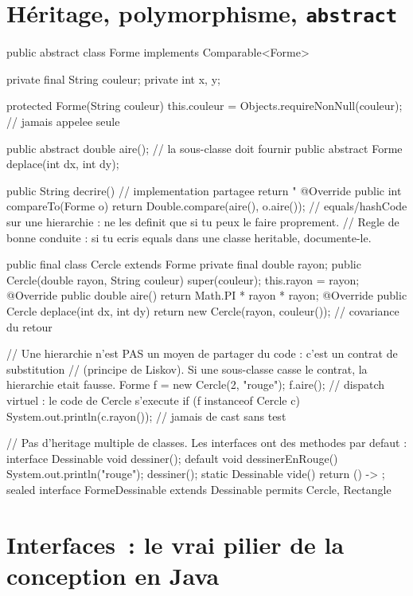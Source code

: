 \section{H\'eritage, polymorphisme, \texttt{abstract}}

\begin{codejava}
public abstract class Forme implements Comparable<Forme> {
    private final String couleur;
    private int x, y;

    protected Forme(String couleur) { this.couleur = Objects.requireNonNull(couleur); }   // jamais appelee seule

    public abstract double aire();                       // la sous-classe doit fournir
    public abstract Forme deplace(int dx, int dy);

    public String decrire() {                          // implementation partagee
        return "%
    }
    @Override public int compareTo(Forme o) { return Double.compare(aire(), o.aire()); }
    // equals/hashCode sur une hierarchie : ne les definit que si tu peux le faire proprement.
    // Regle de bonne conduite : si tu ecris equals dans une classe heritable, documente-le.
}

public final class Cercle extends Forme {
    private final double rayon;
    public Cercle(double rayon, String couleur) { super(couleur); this.rayon = rayon; }
    @Override public double aire() { return Math.PI * rayon * rayon; }
    @Override public Cercle deplace(int dx, int dy) { return new Cercle(rayon, couleur()); }  // covariance du retour
}

// Une hierarchie n'est PAS un moyen de partager du code : c'est un contrat de substitution
// (principe de Liskov). Si une sous-classe casse le contrat, la hierarchie etait fausse.
Forme f = new Cercle(2, "rouge");
f.aire();                       // dispatch virtuel : le code de Cercle s'execute
if (f instanceof Cercle c) { System.out.println(c.rayon()); }   // jamais de cast sans test

// Pas d'heritage multiple de classes. Les interfaces ont des methodes par defaut :
interface Dessinable {
    void dessiner();
    default void dessinerEnRouge() { System.out.println("rouge"); dessiner(); }
    static Dessinable vide() { return () -> { }; }
    sealed interface FormeDessinable extends Dessinable permits Cercle, Rectangle { }
}
\end{codejava}

\section{Interfaces~: le vrai pilier de la conception en Java}


